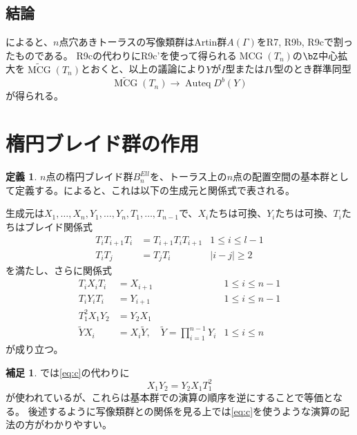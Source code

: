 \documentclass[uplatex, a4paper, dvipdfmx]{jsarticle}
\theoremstyle{definition}
\newtheorem{definition}[theorem]{定義}
\newtheorem{remark}[theorem]{補足}
\DeclareMathOperator{\Auteq}{\mathrm{Auteq}}
\DeclareMathOperator{\MCG}{\mathrm{MCG}}
\begin{document}
\subsection{結論}
\cite{MR1805936}によると、$n$点穴あきトーラスの写像類群はArtin群$A(\Gamma)$をR7, R9b, R9cで割ったものである。
R9cの代わりにR9c'を使って得られる$\MCG(T_n)$の$\bZ$中心拡大を$\widetilde{\MCG}(T_n)$とおくと、以上の議論により$Y$が$I$型または$IV$型のとき群準同型\begin{equation}
    \widetilde{\MCG}(T_n) \to \Auteq D^b(Y)
\end{equation}
が得られる。

\section{楕円ブレイド群の作用}
\begin{definition}
    $n$点の楕円ブレイド群$B^{Ell}_n$を、トーラス上の$n$点の配置空間の基本群として定義する。\cite{MR2507111}によると、これは以下の生成元と関係式で表される。

    生成元は$X_1, \dots, X_n, Y_1, \dots, Y_n, T_1, \dots, T_{n-1}$で、$X_i$たちは可換、$Y_i$たちは可換、$T_i$たちはブレイド関係式
    \begin{align}
        T_iT_{i+1}T_i & = T_{i+1}T_iT_{i+1} & 1\leq i \leq l-1 \\
        T_iT_j        & = T_jT_i            & |i-j|\geq 2
    \end{align}
    を満たし、さらに関係式
    \begin{align}
        T_iX_iT_i        & = X_{i+1}                                                      & 1\leq i \leq n-1 \label{eq:a} \\
        T_iY_iT_i        & = Y_{i+1} \label{eq:b}                                         & 1\leq i \leq n-1              \\
        T_1^2X_1Y_2      & = Y_2X_1\label{eq:c}                                                                           \\
        \widetilde{Y}X_i & = X_i\widetilde{Y},\quad\widetilde{Y} = \prod_{i = 1}^{n-1}Y_i & 1\leq i \leq n \label{eq:d}
    \end{align}
    が成り立つ。
\end{definition}
\begin{remark}
    \cite{MR2507111}では\eqref{eq:c}の代わりに
    \begin{equation}
        X_1Y_2 = Y_2X_1T_1^2
    \end{equation}
    が使われているが、これらは基本群での演算の順序を逆にすることで等価となる。
    後述するように写像類群との関係を見る上では\eqref{eq:c}を使うような演算の記法の方がわかりやすい。
\end{remark}
\end{document}
